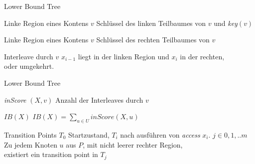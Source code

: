 \documentclass[11pt]{beamer}
\begin{document}
 \begin{frame} {Lower Bound Tree} 
	\begin{block}{Linke Region eines Kontens $v$}
	      Schlüssel des linken Teilbaumes von $v$ und \textit{key}$\left(v\right)$	
	\end{block}
    \begin{block}{Linke Region eines Kontens $v$}
	Schlüssel des rechten Teilbaumes von $v$
	\end{block}
	\begin{block}{Interleave durch $v$}
		$x_{i-1}$ liegt in der linken Region und $x_i$ in der rechten,\\
		oder umgekehrt.
    \end{block}
\end{frame}

 \begin{frame} {Lower Bound Tree} 
	\begin{block}{\textit{inScore} $\left(X, v\right)$}
		Anzahl der Interleaves durch $v$
	\end{block}
	\begin{block}{$\mathit{IB}\left(X\right)$}
		$\mathit{IB}\left(X\right) = \sum_{u \in U} \mathit{inScore}\left(X, u\right)$
	\end{block}
\end{frame}

\begin{frame} {Transition Points} 
	$T_0$ Startzustand, $T_i$ nach ausführen von \textit{access} $x_i$.
	\pause
	$j \in {0,1,..m}$\\
	\bigskip
	Zu jedem Knoten $u$ aus $P$, mit nicht leerer rechter Region,\\
	existiert ein transition point in $T_j$ 
	
	
\end{frame}
\end{document}
